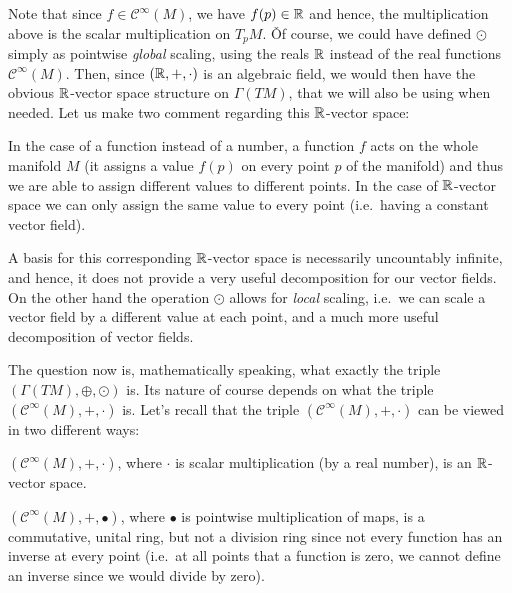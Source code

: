 Note that since $f\in \mathcal{C}^\infty(M)$, we have $f(p)\in \mathbb{R}$ and hence, the multiplication above is the scalar
multiplication on $T_p M$. \v

Of course, we could have defined $\odot$ simply as pointwise \emph{global} scaling, using the reals $\mathbb{R}$ instead of
the real functions $\mathcal{C}^\infty(M)$. Then, since $(\mathbb{R},+,\cdot)$ is an algebraic field, we would then have the
obvious $\mathbb{R}$-vector space structure on $\Gamma(TM)$, that we will also be using when needed. Let us make two comment
regarding this $\mathbb{R}$-vector space:
\bit
\item In the case of a function instead of a number, a function $f$ acts on the whole manifold $M$ (it assigns a
value $f(p)$ on every point $p$ of the manifold) and thus we are able to assign different values to different points.
In the case of $\mathbb{R}$-vector space we can only assign the same value to every point (i.e.\ having a constant vector
field).
\item A basis for this corresponding $\mathbb{R}$-vector space is necessarily uncountably infinite, and hence, it does not
provide a very useful decomposition for our vector fields. On the other hand the operation $\odot$ allows for
\emph{local} scaling, i.e.\ we can scale a vector field by a different value at each point, and a much more useful
decomposition of vector fields.
\eit

The question now is, mathematically speaking, what exactly the triple $(\Gamma(TM),\oplus,\odot)$ is. Its nature of
course depends on what the triple $(\mathcal{C}^\infty(M),+,\cdot)$ is. Let's recall that the triple $
(\mathcal{C}^\infty(M),+,\cdot)$ can be viewed in two different ways:
\bit
\item $(\mathcal{C}^\infty(M),+,\cdot)$, where $\cdot$ is scalar multiplication (by a real number), is an
$\mathbb{R}$-vector space.
\item $(\mathcal{C}^\infty(M),+,\bullet)$, where $\bullet$ is pointwise multiplication of maps, is a commutative,
unital ring, but not a division ring since not every function has an inverse at every point (i.e.\ at all points that a
function is zero, we cannot define an inverse since we would divide by zero).
\eit

